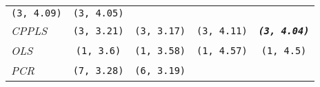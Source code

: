 \documentclass[12pt,A4paper,authoryear]{elsarticle} %
\theoremstyle{definition}
\theoremstyle{definition}
\theoremstyle{remark}
\begin{document}
\begin{longtable}[]{@{}lcccc@{}}
\begin{minipage}[t]{0.19\columnwidth}
\texttt{(3,\ 4.09)}\strut
\end{minipage} & \begin{minipage}[t]{0.19\columnwidth}\centering\strut
\texttt{(3,\ 4.05)}\strut
\end{minipage}\tabularnewline
\begin{minipage}[t]{0.09\columnwidth}\raggedright\strut
\emph{CPPLS}\strut
\end{minipage} & \begin{minipage}[t]{0.19\columnwidth}\centering\strut
\texttt{(3,\ 3.21)}\strut
\end{minipage} & \begin{minipage}[t]{0.19\columnwidth}\centering\strut
\texttt{(3,\ 3.17)}\strut
\end{minipage} & \begin{minipage}[t]{0.19\columnwidth}\centering\strut
\texttt{(3,\ 4.11)}\strut
\end{minipage} & \begin{minipage}[t]{0.19\columnwidth}\centering\strut
\textbf{\emph{\texttt{(3,\ 4.04)}}}\strut
\end{minipage}\tabularnewline
\begin{minipage}[t]{0.09\columnwidth}\raggedright\strut
\emph{OLS}\strut
\end{minipage} & \begin{minipage}[t]{0.19\columnwidth}\centering\strut
\texttt{(1,\ 3.6)}\strut
\end{minipage} & \begin{minipage}[t]{0.19\columnwidth}\centering\strut
\texttt{(1,\ 3.58)}\strut
\end{minipage} & \begin{minipage}[t]{0.19\columnwidth}\centering\strut
\texttt{(1,\ 4.57)}\strut
\end{minipage} & \begin{minipage}[t]{0.19\columnwidth}\centering\strut
\texttt{(1,\ 4.5)}\strut
\end{minipage}\tabularnewline
\begin{minipage}[t]{0.09\columnwidth}\raggedright\strut
\emph{PCR}\strut
\end{minipage} & \begin{minipage}[t]{0.19\columnwidth}\centering\strut
\texttt{(7,\ 3.28)}\strut
\end{minipage} & \begin{minipage}[t]{0.19\columnwidth}\centering\strut
\texttt{(6,\ 3.19)}\strut
\end{minipage} & \begin{minipage}[t]{0.19\columnwidth}\centering\strut

\end{minipage}
\end{longtable}
\end{document}
